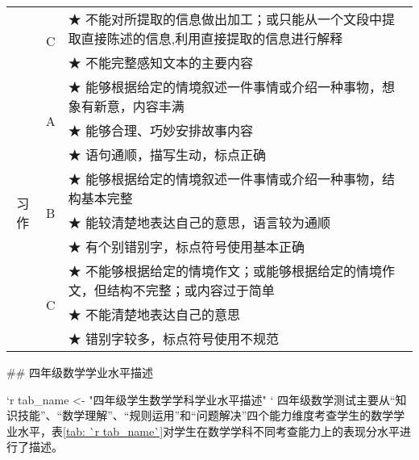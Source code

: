 \begin{itshape}
\begin{longtable}{|c|c|p{12cm}|}
   &   \multirow{2}{*}{C}  & ★	不能对所提取的信息做出加工；或只能从一个文段中提取直接陈述的信息,利用直接提取的信息进行解释 \\  
   & &  ★	不能完整感知文本的主要内容 \\
   
\hline
   \multirow{9}{*}{习作}  & \multirow{3}{*}{A}  & ★	能够根据给定的情境叙述一件事情或介绍一种事物，想象有新意，内容丰满  \\  
   & &  ★	能够合理、巧妙安排故事内容 \\    
   & &  ★	语句通顺，描写生动，标点正确 \\    
\cline{2-3}      

   &   \multirow{3}{*}{B}  &  ★	能够根据给定的情境叙述一件事情或介绍一种事物，结构基本完整 \\  
   & & ★	能较清楚地表达自己的意思，语言较为通顺 \\  
   & &  ★	有个别错别字，标点符号使用基本正确 \\    
\cline{2-3}

   &   \multirow{3}{*}{C}  & ★	不能够根据给定的情境作文；或能够根据给定的情境作文，但结构不完整；或内容过于简单 \\  
   & &  ★	不能清楚地表达自己的意思 \\  
   & &  ★	错别字较多，标点符号使用不规范 \\ 
   
\hline 
\end{longtable}
\end{itshape}


## 四年级数学学业水平描述

`r tab_name <- "四年级学生数学学科学业水平描述" `
四年级数学测试主要从“知识技能”、“数学理解”、“规则运用”和“问题解决”四个能力维度考查学生的数学学业水平，表\ref{tab: `r tab_name`}对学生在数学学科不同考查能力上的表现分水平进行了描述。


